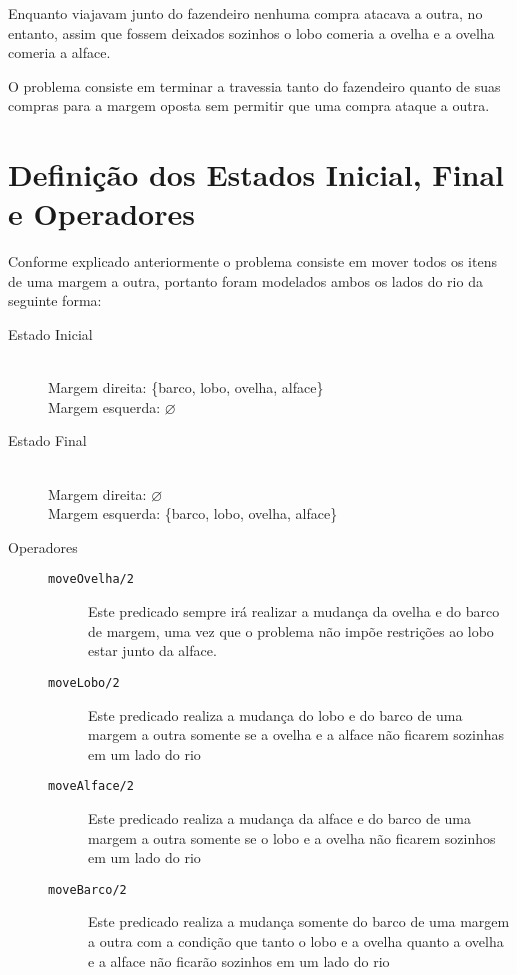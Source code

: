 \documentclass[brazil,times]{abnt}
\begin{document}
	Enquanto viajavam junto do fazendeiro nenhuma compra atacava a outra, no
	entanto, assim que fossem deixados sozinhos o lobo comeria a ovelha e a
	ovelha comeria a alface.
	
	O problema consiste em terminar a travessia tanto do fazendeiro
	quanto de suas compras para a margem oposta sem permitir que uma compra ataque
	a outra. \cite{ptwiki:problema-lobo-ovelha-alface}

\section*{Definição dos Estados Inicial, Final e Operadores}
	Conforme explicado anteriormente o problema consiste em mover todos os itens de
	uma margem a outra, portanto foram modelados ambos os lados do rio da seguinte
	forma:
	
	\begin{description}
		\item[Estado Inicial] \hfill \\
		Margem direita: \{barco, lobo, ovelha, alface\} \\
		Margem esquerda: $\varnothing$
		\item[Estado Final] \hfill \\
		Margem direita: $\varnothing$ \\
		Margem esquerda: \{barco, lobo, ovelha, alface\}
		\item[Operadores] \hfill
			\begin{description}
				\item[\texttt{moveOvelha/2}] Este predicado sempre irá realizar a
				mudança da ovelha e do barco de margem, uma vez que o problema não
				impõe restrições ao lobo estar junto da alface.
				\item[\texttt{moveLobo/2}] Este predicado realiza a mudança do lobo e do
				barco de uma margem a outra somente se a ovelha e a alface não ficarem
				sozinhas em um lado do rio
				\item[\texttt{moveAlface/2}] Este predicado realiza a mudança da alface e do
				barco de uma margem a outra somente se o lobo e a ovelha não ficarem
				sozinhos em um lado do rio 
				\item[\texttt{moveBarco/2}] Este predicado realiza a mudança somente do
				barco de uma margem a outra com a condição que tanto o lobo e a ovelha
				quanto a ovelha e a alface não ficarão sozinhos em um lado do rio 
			\end{description}
	\end{description}
\end{document}
